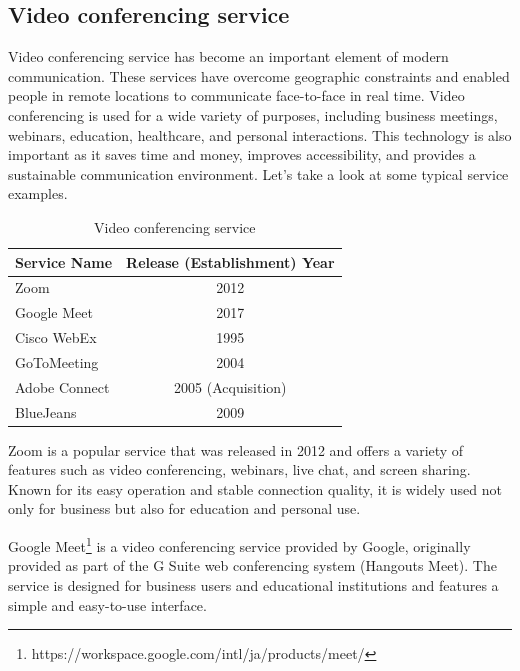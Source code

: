 \documentclass[12pt]{article}
\begin{document}
\subsection{Video conferencing service}
Video conferencing service has become an important element of modern
communication. These services have overcome geographic constraints and enabled
people in remote locations to communicate face-to-face in real time. Video
conferencing is used for a wide variety of purposes, including business
meetings, webinars, education, healthcare, and personal interactions. This
technology is also important as it saves time and money, improves
accessibility, and provides a sustainable communication environment. Let's take
a look at some typical service examples.
\begin{table}[h]
    \begin{center}
        \begin{tabular}{|l|c|} \hline
            Service Name   & Release (Establishment) Year \\ \hline
            Zoom           & 2012                         \\
            Google Meet    & 2017                         \\
            Cisco WebEx    & 1995                         \\
            GoToMeeting    & 2004                         \\
            Adobe  Connect & 2005 (Acquisition)           \\
            BlueJeans      & 2009                         \\ \hline
        \end{tabular}
        \caption{Video conferencing service}
    \end{center}
\end{table}

Zoom is a popular service that was released in 2012 and offers a variety of
features such as video conferencing, webinars, live chat, and screen sharing.
Known for its easy operation and stable connection quality, it is widely used
not only for business but also for education and personal use.

Google Meet\footnote{https://workspace.google.com/intl/ja/products/meet/} is a
video conferencing service provided by Google, originally
provided as part of the G Suite web conferencing system (Hangouts Meet). The
service is designed for business users and educational institutions and
features a simple and easy-to-use interface.
\end{document}
